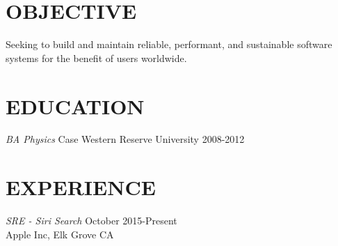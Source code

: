 \documentclass[margin, 10pt]{res} %
\begin{document}
\begin{resume}

 
\section{OBJECTIVE}  

Seeking to build and maintain reliable, performant, and sustainable software systems for the benefit of users worldwide.


\section{EDUCATION}

{\sl BA Physics}  Case Western Reserve University
2008-2012 
 
 
\section{EXPERIENCE}

{\sl SRE - Siri Search} \hfill October 2015-Present \\
Apple Inc, Elk Grove CA


\end{resume}
\end{document}
